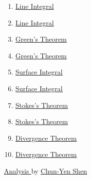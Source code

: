\documentclass[11pt]{article}
\begin{document}
\begin{enumerate}
	\item 	\href{https://mp.weixin.qq.com/s/QOTx9qEUxOEGUVDbOG-U1Q}{Line Integral}	%
	\item 	\href{https://mp.weixin.qq.com/s/nWmqV57OC7MIwzB8OnreCA}{Line Integral}	%
	\item 	\href{https://mp.weixin.qq.com/s/cHQsbGze9gfyGpPs48whmg}{Green's Theorem}	%
	\item 	\href{https://mp.weixin.qq.com/s/6hzqhATS0vjqwkNme_gwXQ}{Green's Theorem}	%
	\item 	\href{https://mp.weixin.qq.com/s/6X3aD1bdlE8y-bmXVEDgKw}{Surface Integral}	%
	\item 	\href{https://mp.weixin.qq.com/s/0E9-FQeg7RRImXCiReTy-Q}{Surface Integral}	%
	\item 	\href{https://mp.weixin.qq.com/s/wU_2UCYMqpWJQpCT1suzFw}{Stokes's Theorem}	%
	\item 	\href{https://mp.weixin.qq.com/s/Vqo_FkIkNZzCrJ9KHieJbg}{Stokes's Theorem}	%
	\item 	\href{https://mp.weixin.qq.com/s/Vpfi4VSlUhd2lwPcw7ub7A}{Divergence Theorem}	%
	\item 	\href{https://mp.weixin.qq.com/s/oqfH6Q-Ksq98lWrX6oDhWA}{Divergence Theorem}	%
\end{enumerate}



\begin{center}
	\large {\href{https://www.youtube.com/playlist?list=PLVJXJebpO4PhhPaG5r3Sxp0w89hqCfi0a}{Analysis }} by \href{https://sites.google.com/site/shencmath/}{Chun-Yen Shen}
\end{center}

\vspace{-0.5cm}
\end{document}

